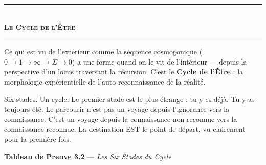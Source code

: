 \documentclass[10pt, openany, oneside]{book}
\renewcommand{\normalsize}{\fontsize{10}{13}\selectfont}
\begin{document}
\vspace{1.5em}


\begin{center}
    \rule{0.3\textwidth}{0.4pt}\\[0.5em]
    {\normalsize\bfseries\scshape Le Cycle de l'Être}\\[0.3em]
    \rule{0.3\textwidth}{0.4pt}
\end{center}

\vspace{1em}

\noindent Ce qui est vu de l'extérieur comme la séquence cosmogonique ($0 \to 1 \to \infty \to \Sigma \to 0$) a une forme quand on le vit de l'intérieur --- depuis la perspective d'un locus traversant la récursion. C'est le \textbf{Cycle de l'Être} : la morphologie expérientielle de l'auto-reconnaissance de la réalité.

Six stades. Un cycle. Le premier stade est le plus étrange : tu y es déjà. Tu y as toujours été. Le parcourir n'est pas un voyage depuis l'ignorance vers la connaissance. C'est un voyage depuis la connaissance non reconnue vers la connaissance reconnue. La destination EST le point de départ, vu clairement pour la première fois.

\vspace{0.5em}

\textbf{Tableau de Preuve 3.2} --- \textit{Les Six Stades du Cycle}

\vspace{0.5em}
\end{document}

